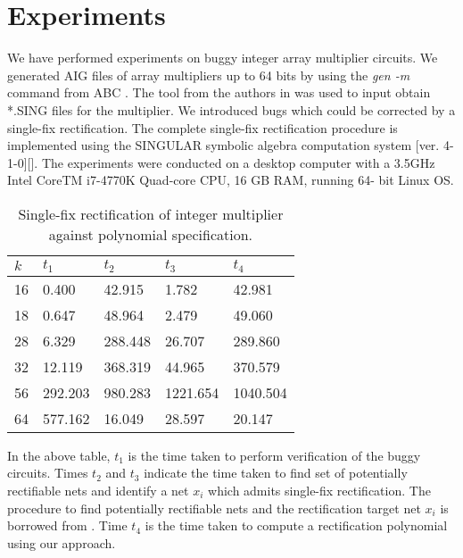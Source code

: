 \vspace{-0.1in}
\section{Experiments}
\label{sec:exp}

We have performed experiments on buggy integer array multiplier circuits. We generated AIG files of array multipliers up to 64 bits by using the \textit{gen -m} command from ABC \cite{ABC}. The tool from the authors in \cite{Armin2017ColumnWiseVO} was used to input obtain *.SING files for the multiplier. We introduced bugs which could be corrected by a single-fix rectification. The complete single-fix rectification procedure is implemented using the SINGULAR symbolic
algebra computation system [ver. 4-1-0][\cite{DGPS_410}]. The experiments
were conducted on a desktop computer with a 3.5GHz Intel
CoreTM i7-4770K Quad-core CPU, 16 GB RAM, running 64-
bit Linux OS. 
\vspace{0.1mm}
\begin{table}[H]
    \centering
    \begin{tabular}{| l | l | l | l | l |}
    \hline
    $k$ & $t_1$ & $t_2$ & $t_3$ & $t_4$ \\ \hline
    16 & 0.400 & 42.915 & 1.782 & 42.981 \\ \hline
    18 & 0.647 & 48.964 & 2.479 & 49.060  \\ \hline
    28 & 6.329 & 288.448 & 26.707  & 289.860\\ \hline
    32 & 12.119 & 368.319 & 44.965 & 370.579 \\ \hline
    56 & 292.203 & 980.283 & 1221.654 & 1040.504 \\ \hline
    64 & 577.162 & 16.049 & 28.597 & 20.147 \\
    \hline
    \end{tabular}
    \caption{Single-fix rectification of integer multiplier against polynomial specification.}
    \label{tb:tb1}
\end{table}

In the above table, $t_1$ is the time taken to perform verification of the buggy circuits. Times $t_2$ and $t_3$ indicate the time taken to find set of potentially rectifiable nets and identify a net $x_i$ which admits single-fix rectification. The procedure to find potentially rectifiable nets and the rectification target net $x_i$ is borrowed from \cite{utkarsh:fmcad18}. Time $t_4$ is the time taken to compute a rectification polynomial using our approach. 

